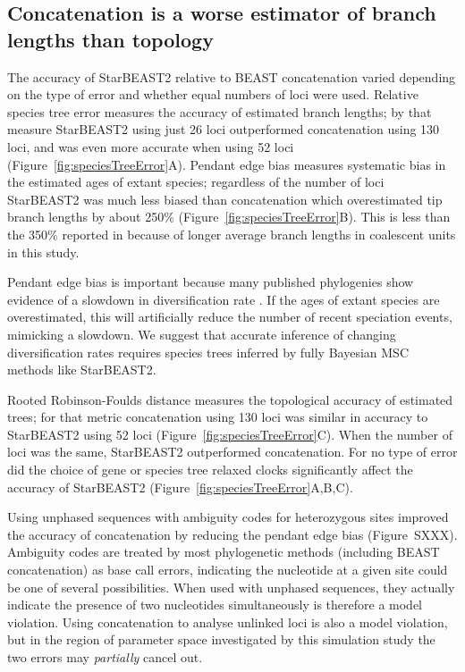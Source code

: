 \documentclass[12pt]{article}
\begin{document}
\subsection{Concatenation is a worse estimator of branch lengths than topology}

The accuracy of StarBEAST2 relative to BEAST concatenation varied depending on
the type of error and whether equal numbers of loci were used. Relative
species tree error measures the accuracy of estimated branch lengths; by that
measure StarBEAST2 using just 26 loci outperformed concatenation using 130
loci, and was even more accurate when using 52 loci
(Figure~\ref{fig:speciesTreeError}A). Pendant edge bias measures systematic
bias in the estimated ages of extant species; regardless of the number of loci
StarBEAST2 was much less biased than concatenation which overestimated tip
branch lengths by about 250\% (Figure~\ref{fig:speciesTreeError}B). This is
less than the 350\% reported in \cite{Ogilvie01052016} because of longer
average branch lengths in coalescent units in this study.

Pendant edge bias is important because many published phylogenies show
evidence of a slowdown in diversification rate \citep{Moen2014190}. If the
ages of extant species are overestimated, this will artificially reduce the
number of recent speciation events, mimicking a slowdown. We suggest that
accurate inference of changing diversification rates requires species trees
inferred by fully Bayesian MSC methods like StarBEAST2.

Rooted Robinson-Foulds distance measures the topological accuracy of estimated
trees; for that metric concatenation using 130 loci was similar in accuracy to
StarBEAST2 using 52 loci (Figure~\ref{fig:speciesTreeError}C). When the number
of loci was the same, StarBEAST2 outperformed concatenation. For no type of
error did the choice of gene or species tree relaxed clocks significantly
affect the accuracy of StarBEAST2 (Figure~\ref{fig:speciesTreeError}A,B,C).

Using unphased sequences with ambiguity codes for heterozygous sites improved
the accuracy of concatenation by reducing the pendant edge bias (Figure~SXXX).
Ambiguity codes are treated by most phylogenetic methods (including BEAST
concatenation) as base call errors, indicating the nucleotide at a given site
could be one of several possibilities. When used with unphased sequences, they
actually indicate the presence of two nucleotides simultaneously is therefore
a model violation. Using concatenation to analyse unlinked loci is also a
model violation, but in the region of parameter space investigated by this
simulation study the two errors may \textit{partially} cancel out.
\end{document}
